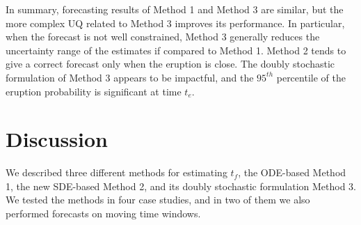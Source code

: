 \documentclass{article}
\begin{document}
In summary, forecasting results of Method 1 and Method 3 are similar, but the more complex UQ related to Method 3 improves its performance. In particular, when the forecast is not well constrained, Method 3 generally reduces the uncertainty range of the estimates if compared to Method 1. Method 2 tends to give a correct forecast only when the eruption is close. The doubly stochastic formulation of Method 3 appears to be impactful, and the $95^{th}$ percentile of the eruption probability is significant at time $t_e$.

\section{Discussion}\label{s6}
We described three different methods for estimating $t_f$, the ODE-based Method 1, the new SDE-based Method 2, and its doubly stochastic formulation Method 3. We tested the methods in four case studies, and in two of them we also performed forecasts on moving time windows.
\end{document}
